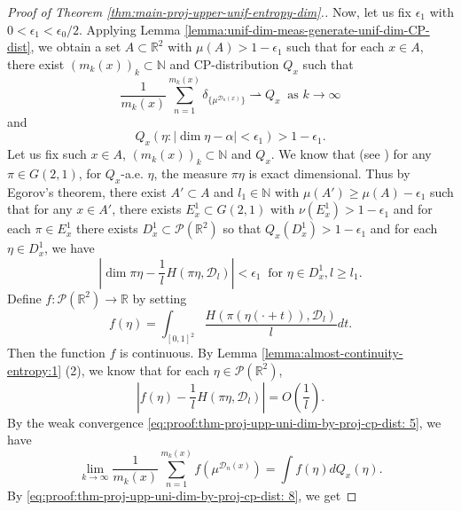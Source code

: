 \documentclass[a4paper,11pt]{amsart}
\theoremstyle{definition}
\numberwithin{equation}{section}
\def\to{\rightarrow}
\def\D{\mathcal{D}}
\def\cP{\mathcal P}
\def\N{\mathbb N}
\def\R{\mathbb R}
\begin{document}
\begin{proof}[Proof of Theorem \ref{thm:main-proj-upper-unif-entropy-dim}.]
Now, let us fix $\epsilon_1$ with $0<\epsilon_1<\epsilon_0/2$.  Applying Lemma \ref{lemma:unif-dim-meas-generate-unif-dim-CP-dist},  we obtain a set  $A\subset \R^2$ with $\mu(A)>1-\epsilon_1$ such that for each $x\in A$, there exist $(m_k(x))_k\subset \N$ and CP-distribution $Q_x$ such that 
\begin{equation}\label{eq:proof:thm-proj-upp-uni-dim-by-proj-cp-dist: 5}
\frac{1}{m_k(x)}\sum_{n=1}^{m_k(x)} \delta_{\{ \mu^{\D_n(x)} \}}  \rightharpoonup  Q_x \  \textrm{ as } k\to \infty
\end{equation} 
and
\begin{equation}\label{eq:proof:thm-proj-upp-uni-dim-by-proj-cp-dist: 6}
Q_x\left(\eta: |\dim \eta-\alpha|<\epsilon_1\right)>1-\epsilon_1.
\end{equation} 
Let us fix such  $x\in A$,  $(m_k(x))_k\subset \N$ and $Q_x$.   We know that (see \cite[theorem 1.22]{Hochman2010-fractal-distributions}) for any $\pi\in G(2,1)$,  for $Q_x$-a.e.  $\eta$,   the measure $\pi\eta$ is exact dimensional. Thus by Egorov's theorem, there exist $A'\subset A$ and $l_1\in \N$ with $\mu(A')\ge \mu(A)-\epsilon_1$ such that for any $x\in A'$, there exists $E^1_x\subset G(2,1)$ with $\nu(E^1_x)>1-\epsilon_1$ and  for each  $\pi\in E^1_x$ there exists $D_x^1\subset \cP(\R^2)$ so that $Q_x(D_x^1)>1-\epsilon_1$ and for each $\eta\in D^1_x$,  we have
\begin{equation}\label{eq:proof:thm-proj-upp-uni-dim-by-proj-cp-dist: 7}
\left| \dim \pi\eta -\frac{1}{l}H(\pi\eta,\D_l) \right| <\epsilon_1 \ \textrm{ for } \eta\in D_x^1,  l\ge l_1.
\end{equation}
Define  $f:\cP(\R^2)\to \R$ by setting
\[
f(\eta)=\int_{[0,1]^2}\frac{H\left(\pi(\eta(\cdot+t)),\D_l\right)}{l}dt.
\]
Then the  function $f$ is continuous.  By Lemma \ref{lemma:almost-continuity-entropy:1} (2), we know that for each $\eta\in \cP(\R^2)$, 
\begin{equation}\label{eq:proof:thm-proj-upp-uni-dim-by-proj-cp-dist: 8}
\left|f(\eta)-\frac{1}{l}H(\pi\eta,\D_l)\right| = O\left(\frac{1}{l}\right). 
\end{equation}
By the weak convergence \eqref{eq:proof:thm-proj-upp-uni-dim-by-proj-cp-dist: 5}, we have 
\begin{equation}\label{eq:proof:thm-proj-upp-uni-dim-by-proj-cp-dist: 9}
\lim_{k\to\infty}\frac{1}{m_k(x)}\sum_{n=1}^{m_k(x)}   f(\mu^{\D_n(x)})  =  \int  f(\eta) d Q_x(\eta).
\end{equation}
By \eqref{eq:proof:thm-proj-upp-uni-dim-by-proj-cp-dist: 8}, we get 

\end{proof}
\end{document}

